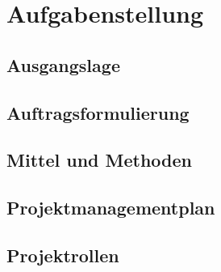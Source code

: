 \chapter{Aufgabenstellung}
\section{Ausgangslage}
\section{Auftragsformulierung}
\section{Mittel und Methoden}
\section{Projektmanagementplan}
\section{Projektrollen}
